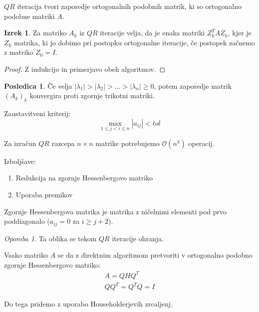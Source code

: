\documentclass[a4paper,12pt]{article}
\theoremstyle{definition}
\newtheorem{conseq}[counter]{Posledica}
\newtheorem{theorem}[counter]{Izrek}
\theoremstyle{remark}
\newtheorem*{rem}{Opomba}
\begin{document}
$QR$ iteracija tvori zaporedje ortogonalnih podobnih matrik, ki so ortogonalno podobne matriki $A$.

\begin{theorem}
    Za matriko $A_k$ iz $QR$ iteracije velja, da je enaka matriki $Z_k^T A Z_k$, kjer je $Z_k$ matrika, ki jo dobimo pri postopku ortogonalne iteracije,
    če postopek začnemo z matriko $Z_0 = I$.
\end{theorem}

\begin{proof}
    Z indukcijo in primerjavo obeh algoritmov.
\end{proof}

\begin{conseq}
    Če velja $| \lambda_1 | > | \lambda_2 | > \dots > | \lambda_n | \geq 0$, potem zaporedje matrik $(A_k)_k$ konvergira proti zgornje trikotni matriki.
\end{conseq}

Zaustavitveni kriterij:
\begin{equation*}
    \max_{1 \leq j < i \leq n} |a_{ij}| < tol
\end{equation*}

Za izračun $QR$ razcepa $n \times n$ matrike potrebujemo $\mathcal{O}(n^3)$ operacij.

Izboljšave:
\begin{enumerate}
    \item Redukcija na zgornje Hessenbergovo matriko
    \item Uporaba premikov
\end{enumerate}

Zgornje Hessenbergova matrika je matrika z ničelnimi elementi pod prvo poddiagonalo ($a_{ij} = 0$ za $i \geq j+2$).

\begin{rem}
    Ta oblika se tekom $QR$ iteracije ohranja.
\end{rem}

Vsako matriko $A$ se da z direktnim algoritmom pretvoriti v ortogonalno podobno zgornje Hessenbergovo matriko:
\begin{gather*}
    A = Q H Q^T \\
    Q Q^T = Q^T Q = I
\end{gather*}

Do tega pridemo z uporabo Householderjevih zrcaljenj.
\end{document}
